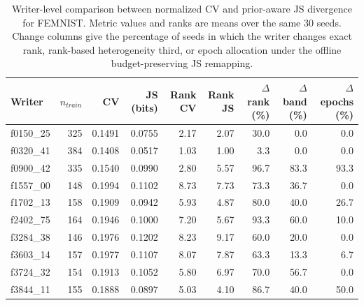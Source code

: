 \begin{table}[t]
\centering
\caption{Writer-level comparison between normalized CV and prior-aware JS divergence for FEMNIST. Metric values and ranks are means over the same 30 seeds. Change columns give the percentage of seeds in which the writer changes exact rank, rank-based heterogeneity third, or epoch allocation under the offline budget-preserving JS remapping.}
\label{tab:femnist-ten-writer-detail}
\small
\begin{tabular}{lrrrrrrrr}
\toprule
Writer & $n_{train}$ & CV & JS (bits) & Rank CV & Rank JS & $\Delta$rank (\%) & $\Delta$band (\%) & $\Delta$epochs (\%) \\
\midrule
f0150\_25 & 325 & 0.1491 & 0.0755 & 2.17 & 2.07 & 30.0 & 0.0 & 0.0 \\
f0320\_41 & 384 & 0.1408 & 0.0517 & 1.03 & 1.00 & 3.3 & 0.0 & 0.0 \\
f0900\_42 & 335 & 0.1540 & 0.0990 & 2.80 & 5.57 & 96.7 & 83.3 & 93.3 \\
f1557\_00 & 148 & 0.1994 & 0.1102 & 8.73 & 7.73 & 73.3 & 36.7 & 0.0 \\
f1702\_13 & 158 & 0.1909 & 0.0942 & 5.93 & 4.87 & 80.0 & 40.0 & 26.7 \\
f2402\_75 & 164 & 0.1946 & 0.1000 & 7.20 & 5.67 & 93.3 & 60.0 & 10.0 \\
f3284\_38 & 146 & 0.1976 & 0.1202 & 8.23 & 9.17 & 60.0 & 20.0 & 0.0 \\
f3603\_14 & 157 & 0.1977 & 0.1107 & 8.07 & 7.87 & 63.3 & 13.3 & 6.7 \\
f3724\_32 & 154 & 0.1913 & 0.1052 & 5.80 & 6.97 & 70.0 & 56.7 & 0.0 \\
f3844\_11 & 155 & 0.1888 & 0.0897 & 5.03 & 4.10 & 86.7 & 40.0 & 50.0 \\
\bottomrule
\end{tabular}
\end{table}
